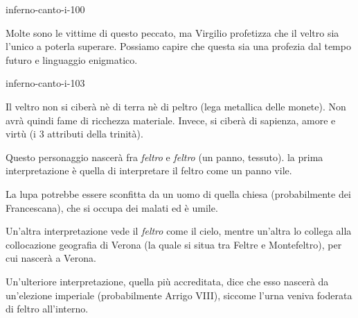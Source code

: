 \documentclass[preview]{standalone}
\begin{document}
\begin{snippet}{inferno-canto-i-100}

    Molte sono le vittime di questo peccato, ma Virgilio profetizza che il veltro sia l'unico
    a poterla superare.
    Possiamo capire che questa sia una profezia dal tempo futuro e linguaggio enigmatico.
\end{snippet}

\begin{snippet}{inferno-canto-i-103}
    
    Il veltro non si ciberà nè di terra nè di peltro (lega metallica delle monete).
    Non avrà quindi fame di ricchezza materiale.
    Invece, si ciberà di sapienza, amore e virtù (i 3 attributi della trinità).
    
    Questo personaggio nascerà fra \textit{feltro} e \textit{feltro} (un panno, tessuto).
    la prima interpretazione è quella di interpretare il feltro come un panno vile.

    La lupa potrebbe essere sconfitta da un uomo di quella chiesa (probabilmente dei Francescana),
    che si occupa dei malati ed è umile.

    Un'altra interpretazione vede il \textit{feltro} come il cielo,
    mentre un'altra lo collega alla collocazione geografia di Verona (la quale si
    situa tra Feltre e Montefeltro), per cui nascerà a Verona.

    Un'ulteriore interpretazione, quella più accreditata, dice che esso nascerà da un'elezione imperiale
    (probabilmente Arrigo VIII), siccome l'urna veniva foderata di feltro all'interno.
\end{snippet}
\end{document}
